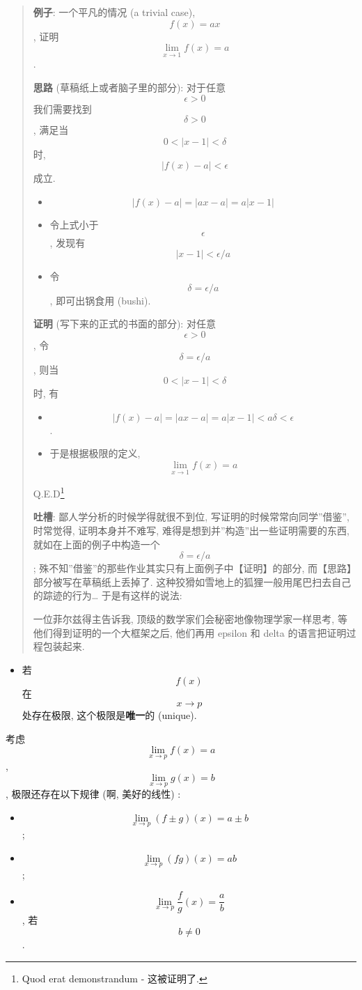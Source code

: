 \begin{quote}
\textbf{例子}: 一个平凡的情况 (a trivial case), \[f(x)=ax\], 证明
\[\lim_{x\rightarrow 1}f(x)=a\].

\textbf{思路} (草稿纸上或者脑子里的部分): 对于任意 \[\epsilon>0\]
我们需要找到 \[\delta>0\], 满足当 \[0<|x-1|<\delta\] 时,
\[|f(x)-a|<\epsilon\] 成立.

\begin{itemize}
\item
  \[|f(x)-a|=|ax-a|=a|x-1|\]
\item
  令上式小于 \[\epsilon\], 发现有 \[|x-1|<\epsilon/a\]
\item
  令 \[\delta=\epsilon/a\] , 即可出锅食用 (bushi).
\end{itemize}

\textbf{证明} (写下来的正式的书面的部分): 对任意 \[\epsilon>0\] , 令
\[\delta=\epsilon/a\], 则当 \[0<|x-1|<\delta\] 时, 有

\begin{itemize}
\tightlist
\item
  \[|f(x)-a|=|ax-a|=a|x-1|<a\delta<\epsilon\].
\item
  于是根据极限的定义, \[\lim_{x\rightarrow 1}f(x)=a\]
\end{itemize}

Q.E.D\footnote{Quod erat demonstrandum - 这被证明了.}

\textbf{吐槽}: 鄙人学分析的时候学得就很不到位,
写证明的时候常常向同学''借鉴'', 时常觉得, 证明本身并不难写,
难得是想到并''构造''出一些证明需要的东西, 就如在上面的例子中构造一个
\[\delta=\epsilon/a\];
殊不知''借鉴''的那些作业其实只有上面例子中【证明】的部分,
而【思路】部分被写在草稿纸上丢掉了.
这种狡猾如雪地上的狐狸一般用尾巴扫去自己的踪迹的行为\ldots{}
于是有这样的说法:

一位菲尔兹得主告诉我, 顶级的数学家们会秘密地像物理学家一样思考,
等他们得到证明的一个大框架之后, 他们再用 epsilon 和 delta
的语言把证明过程包装起来.
\end{quote}

\begin{itemize}
\tightlist
\item
  若 \[f(x)\] 在 \[x\rightarrow p\] 处存在极限,
  这个极限是\textbf{唯一}的 (unique).
\end{itemize}

考虑 \[\lim_{x\rightarrow p}f(x)=a\], \[\lim_{x\rightarrow p}g(x)=b\],
极限还存在以下规律 (啊, 美好的线性) :

\begin{itemize}
\tightlist
\item
  \[\lim_{x\rightarrow p}(f\pm g)(x)=a\pm b\];
\item
  \[\lim_{x\rightarrow p}(fg)(x)=ab\];
\item
  \[\lim_{x\rightarrow p}\frac{f}{g}(x)=\frac{a}{b}\], 若 \[b\neq 0\].
\end{itemize}

